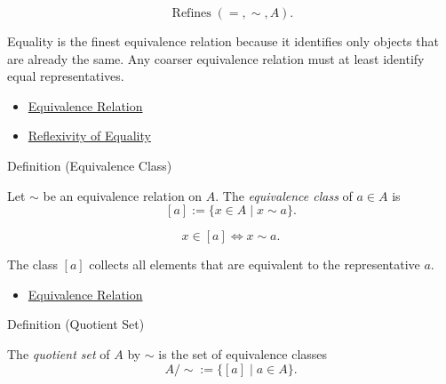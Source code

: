 \begin{remark*}
\[
\operatorname{Refines}(=,\sim,A).
\]
\end{remark*}

\begin{remark*}[Interpretation]
Equality is the finest equivalence relation because it identifies only objects
that are already the same. Any coarser equivalence relation must at least
identify equal representatives.
\end{remark*}

\begin{dependencies}
\begin{itemize}
  \item \hyperref[def:equivalence-relation]{Equivalence Relation}
  \item \hyperref[ax:equality-reflexivity]{Reflexivity of Equality}
\end{itemize}
\end{dependencies}

\begin{definitionbox}{Definition (Equivalence Class)}
\begin{definition}
\label{def:equivalence-class}
Let $\sim$ be an equivalence relation on $A$. The \emph{equivalence class}
of $a\in A$ is
\[
[a] := \{x\in A \mid x\sim a\}.
\]
\end{definition}
\end{definitionbox}

\begin{remark*}
\[
x\in [a] \Longleftrightarrow x\sim a.
\]
\end{remark*}

\begin{remark*}[Interpretation]
The class $[a]$ collects all elements that are equivalent to the
representative $a$.
\end{remark*}

\begin{dependencies}
\begin{itemize}
  \item \hyperref[def:equivalence-relation]{Equivalence Relation}
\end{itemize}
\end{dependencies}

\begin{topicbox}{Definition (Quotient Set)}
\begin{exposition}
The \emph{quotient set} of $A$ by $\sim$ is the set of equivalence classes
\[
A/{\sim} := \{[a]\mid a\in A\}.
\]
\end{exposition}
\end{topicbox}

